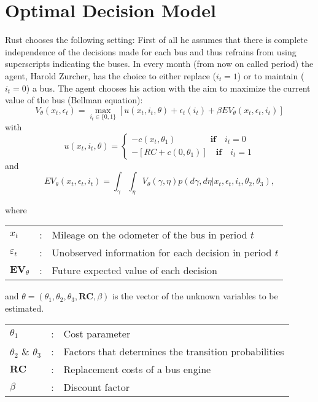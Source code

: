 \documentclass[a4paper,12pt,bold]{scrartcl}
\begin{document}
\section{Optimal Decision Model}
Rust chooses the following setting: First of all he assumes that there is complete independence of the decisions made for each bus and thus refrains from using superscripts indicating the buses. In every month (from now on called period) the agent, Harold Zurcher, has the choice to either replace (\(i_t = 1 \)) or to maintain (\(i_t = 0\)) a bus. The agent chooses his action with the aim to maximize the current value of the bus (Bellman equation):
  \begin{equation}
    V_{\theta}(x_t, \epsilon_t) = \max_{i_t \in \{0, 1\}} [ u(x_t, i_t, \theta) + \epsilon_t (i_t) + \beta EV_{ \theta }( x_t, \epsilon_t, i_t) ]
  \end{equation}
with
\begin{equation}
  u(x_t,i_t, \theta)=
  \begin{cases}
  -c(x_t, \theta_1)\qquad \qquad  \textbf{if} \quad i_t=0 \\
  -[RC + c(0, \theta_1)]\quad \textbf{if} \quad i_t=1
  \end{cases}
\end{equation}
and
\begin{equation}
  EV_{\theta}(x_t, \epsilon_t, i_t) = \int_{\gamma}\int_{\eta} V_{\theta}(\gamma, \eta)p(d\gamma, d\eta | x_t, \epsilon_t, i_t, \theta_2, \theta_3),
\end{equation}

  \bigskip
where \\
\begin{table}[htbp]
    \centering %
    \begin{tabular}{l c p{10cm} }
        $x_t$ & : & Mileage on the odometer of the bus in period $t$\\
        $\varepsilon_t$ & : & Unobserved information for each decision in period $t$\\
        $\mathbf{EV}_{\theta}$ & : & Future expected value of each decision\\
    \end{tabular}
\end{table}

and $\theta = \left(\theta_1, \theta_2, \theta_3, \mathbf{RC}, \beta \right)$ is the vector of the unknown variables to be estimated.



\begin{table}[htbp]
    \centering %
    \begin{tabular}{l c p{10cm} }
        $\theta_1$ & : & Cost parameter\\
        $\theta_2$ \& $\theta_3$ & : & Factors that determines the transition probabilities\\
        $\mathbf{RC}$ & : & Replacement costs of a bus engine\\
        $\beta$ & : & Discount factor\\
    \end{tabular}
\end{table}
\end{document}
